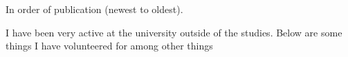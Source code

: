 


\medskip




\newpage
\begin{fullwidth}
  In order of publication (newest to oldest).

  \nocite{*}    %
  \vspace{-2em} %

  \printbibliography
\end{fullwidth}





\medskip




I have been very active at the university outside of the studies. Below are some
things I have volunteered for among other things

\medskip



\divider



\divider




